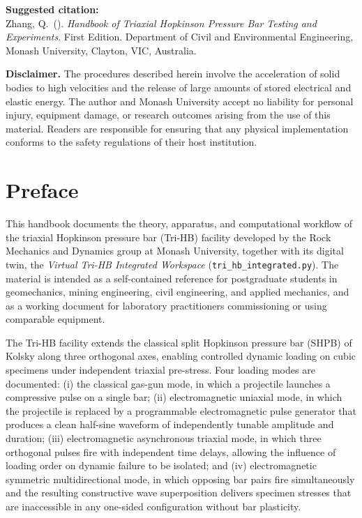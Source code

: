 \documentclass[11pt,a4paper,openany]{book}
\theoremstyle{handbook}
\begin{document}
\bigskip
\noindent\textbf{Suggested citation:}\\
Zhang, Q.\ (\the\year). \textit{Handbook of Triaxial Hopkinson Pressure Bar
Testing and Experiments}. First Edition. Department of Civil and Environmental
Engineering, Monash University, Clayton, VIC, Australia.

\bigskip
\noindent\textbf{Disclaimer.} The procedures described herein involve the
acceleration of solid bodies to high velocities and the release of large
amounts of stored electrical and elastic energy. The author and Monash
University accept no liability for personal injury, equipment damage, or
research outcomes arising from the use of this material. Readers are
responsible for ensuring that any physical implementation conforms to the
safety regulations of their host institution.
\vfill

\chapter*{Preface}

\noindent This handbook documents the theory, apparatus, and computational
workflow of the triaxial Hopkinson pressure bar (Tri-HB) facility developed by
the Rock Mechanics and Dynamics group at Monash University, together with its
digital twin, the \emph{Virtual Tri-HB Integrated Workspace}
(\texttt{tri\_hb\_integrated.py}). The material is intended as a self-contained
reference for postgraduate students in geomechanics, mining engineering,
civil engineering, and applied mechanics, and as a working document for
laboratory practitioners commissioning or using comparable equipment.

The Tri-HB facility extends the classical split Hopkinson pressure bar (SHPB)
of Kolsky \cite{Kolsky1949} along three orthogonal axes, enabling controlled
dynamic loading on cubic specimens under independent triaxial pre-stress. Four
loading modes are documented: (i) the classical gas-gun mode, in which a
projectile launches a compressive pulse on a single bar; (ii) electromagnetic
uniaxial mode, in which the projectile is replaced by a programmable
electromagnetic pulse generator that produces a clean half-sine waveform of
independently tunable amplitude and duration; (iii) electromagnetic
asynchronous triaxial mode, in which three orthogonal pulses fire with
independent time delays, allowing the influence of loading order on dynamic
failure to be isolated; and (iv) electromagnetic symmetric multidirectional
mode, in which opposing bar pairs fire simultaneously and the resulting
constructive wave superposition delivers specimen stresses that are inaccessible
in any one-sided configuration without bar plasticity.
\end{document}
